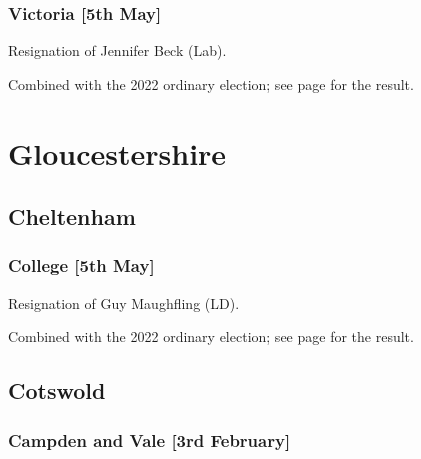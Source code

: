 \documentclass[a4paper,openany]{book}
\begin{document}
\begin{resultsiii}
\subsubsection*{Victoria \hspace*{\fill}\nolinebreak[1]%
	\enspace\hspace*{\fill}
	[5th May]}


Resignation of Jennifer Beck (Lab).

Combined with the 2022 ordinary election; see page \pageref{SouthendVictoria} for the result.

\section{Gloucestershire}

\subsection*{Cheltenham}

\subsubsection*{College \hspace*{\fill}\nolinebreak[1]%
	\enspace\hspace*{\fill}
	[5th May]}


Resignation of Guy Maughfling (LD).

Combined with the 2022 ordinary election; see page \pageref{CheltenhamCollege} for the result.

\subsection*{Cotswold}

\subsubsection*{Campden and Vale \hspace*{\fill}\nolinebreak[1]%
	\enspace\hspace*{\fill}
	[3rd February]}



\end{resultsiii}
\end{document}
